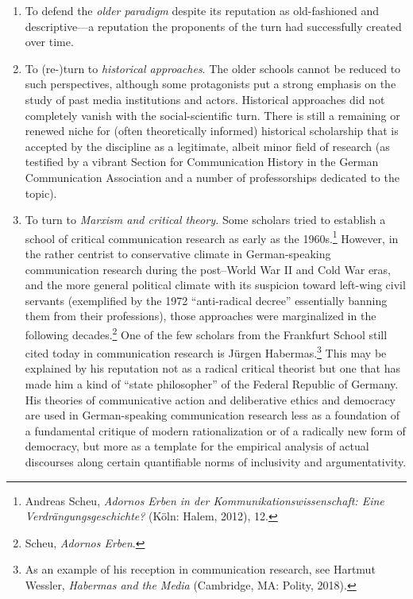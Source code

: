 \documentclass{tufte-handout}
\begin{document}
\begin{enumerate}
\item
  To defend the \emph{older paradigm} despite its reputation as
  old-fashioned and descriptive---a reputation the proponents of the
  turn had successfully created over time.
\item
  To (re-)turn to \emph{historical approaches}. The older schools cannot
  be reduced to such perspectives, although some protagonists put a
  strong emphasis on the study of past media institutions and actors.
  Historical approaches did not completely vanish with the
  social-scientific turn. There is still a remaining or renewed niche
  for (often theoretically informed) historical scholarship that is
  accepted by the discipline as a legitimate, albeit minor field of
  research (as testified by a vibrant Section for Communication History
  in the German Communication Association and a number of professorships
  dedicated to the topic).
\item
  To turn to \emph{Marxism and critical theory.} Some scholars tried to
  establish a school of critical communication research as early as the
  1960s.\footnote{Andreas Scheu, \emph{Adornos Erben in der
    Kommunikationswissenschaft: Eine Verdrängungsgeschichte?} (Köln:
    Halem, 2012), 12.} However, in the rather centrist to conservative
  climate in German-speaking communication research during the
  post--World War II and Cold War eras, and the more general political
  climate with its suspicion toward left-wing civil servants
  (exemplified by the 1972 ``anti-radical decree'' essentially banning
  them from their professions), those approaches were marginalized in
  the following decades.\footnote{Scheu, \emph{Adornos Erben}.} One of
  the few scholars from the Frankfurt School still cited today in
  communication research is Jürgen Habermas.\footnote{As an example of
    his reception in communication research, see Hartmut Wessler,
    \emph{Habermas and the Media} (Cambridge, MA: Polity, 2018).} This
  may be explained by his reputation not as a radical critical theorist
  but one that has made him a kind of ``state philosopher'' of the
  Federal Republic of Germany. His theories of communicative action and
  deliberative ethics and democracy are used in German-speaking
  communication research less as a foundation of a fundamental critique
  of modern rationalization or of a radically new form of democracy, but
  more as a template for the empirical analysis of actual discourses
  along certain quantifiable norms of inclusivity and argumentativity.

\end{enumerate}
\end{document}
